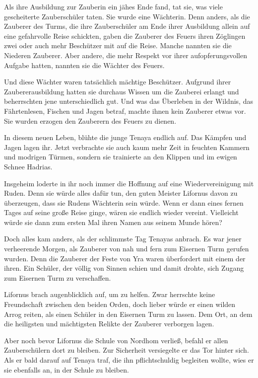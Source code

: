 \documentclass[10pt, a4paper, oneside]{book}
\begin{document}
\begin{multicols}{2}
Als ihre Ausbildung zur Zauberin ein jähes Ende fand, tat sie, was viele gescheiterte Zauberschüler taten. Sie wurde eine Wächterin. Denn anders, als die Zauberer des Turms, die ihre Zauberschüler am Ende ihrer Ausbildung allein auf eine gefahrvolle Reise schickten, gaben die Zauberer des Feuers ihren Zöglingen zwei oder auch mehr Beschützer mit auf die Reise. Manche nannten sie die Niederen Zauberer. Aber andere, die mehr Respekt vor ihrer aufopferungsvollen Aufgabe hatten, nannten sie die Wächter des Feuers.

Und diese Wächter waren tatsächlich mächtige Beschützer. Aufgrund ihrer Zaubererausbildung hatten sie durchaus Wissen um die Zauberei erlangt und beherrschten jene unterschiedlich gut. Und was das Überleben in der Wildnis, das Fährtenlesen, Fischen und Jagen betraf, machte ihnen kein Zauberer etwas vor. Sie wurden erzogen den Zauberern des Feuers zu dienen.

In diesem neuen Leben, blühte die junge Tenaya endlich auf. Das Kämpfen und Jagen lagen ihr. Jetzt verbrachte sie auch kaum mehr Zeit in feuchten Kammern und modrigen Türmen, sondern sie trainierte an den Klippen und im ewigen Schnee Hadrias.

Insgeheim loderte in ihr noch immer die Hoffnung auf eine Wiedervereinigung mit Ruden. Denn sie würde alles dafür tun, den guten Meister Lifornus davon zu überzeugen, dass sie Rudens Wächterin sein würde. Wenn er dann eines fernen Tages auf seine große Reise ginge, wären sie endlich wieder vereint. Vielleicht würde sie dann zum ersten Mal ihren Namen aus seinem Munde hören?

Doch alles kam anders, als der schlimmste Tag Tenayas anbrach. Es war jener verheerende Morgen, als Zauberer von nah und fern zum Eisernen Turm gerufen wurden. Denn die Zauberer der Feste von Yra waren überfordert mit einem der ihren. Ein Schüler, der völlig von Sinnen schien und damit drohte, sich Zugang zum Eisernen Turm zu verschaffen.

Lifornus brach augenblicklich auf, um zu helfen. Zwar herrschte keine Freundschaft zwischen den beiden Orden, doch lieber würde er einen wilden Arrog reiten, als einen Schüler in den Eisernen Turm zu lassen. Dem Ort, an dem die heiligsten und mächtigsten Relikte der Zauberer verborgen lagen.

Aber noch bevor Lifornus die Schule von Nordhom verließ, befahl er allen Zauberschülern dort zu bleiben. Zur Sicherheit versiegelte er das Tor hinter sich. Als er bald darauf auf Tenaya traf, die ihn pflichtschuldig begleiten wollte, wies er sie ebenfalls an, in der Schule zu bleiben.


\end{multicols}
\end{document}
